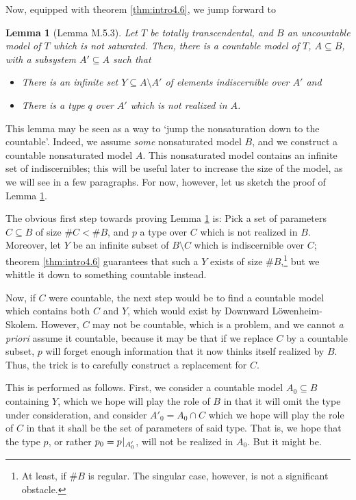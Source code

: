 \documentclass{article}
\newtheorem{lemma}[theorem]{Lemma}
\theoremstyle{nonumberplain}
\newcommand{\card}[1]{\#{#1}}
\newcommand{\rst}[2]{#1\mspace{1.3mu plus 0.5mu minus 0.5mu}|_{#2}}
\begin{document}
Now, equipped with theorem \ref{thm:intro4.6}, we jump forward to
\begin{lemma}[Lemma M.5.3]\label{lem:intro5.3}
Let $T$ be totally transcendental, and $B$ an uncountable model of $T$ which is not saturated. Then, there is a countable model of $T$, $A \subseteq B$, with a subsystem $A' \subseteq A$ such that
\begin{itemize}
\item There is an infinite set $Y \subseteq A \setminus A'$ of elements indiscernible over $A'$ and
\item There is a type $q$ over $A'$ which is not realized in $A$.
\end{itemize}
\end{lemma}

This lemma may be seen as a way to `jump the nonsaturation down to the countable'. Indeed, we assume \emph{some} nonsaturated model $B$, and we construct a countable nonsaturated model $A$. This nonsaturated model contains an infinite set of indiscernibles; this will be useful later to increase the size of the model, as we will see in a few paragraphs. For now, however, let us sketch the proof of Lemma \ref{lem:intro5.3}.

The obvious first step towards proving Lemma \ref{lem:intro5.3} is: Pick a set of parameters $C \subseteq B$ of size $\card C < \card B$, and $p$ a type over $C$ which is not realized in $B$. Moreover, let $Y$ be an infinite subset of $B \setminus C$ which is indiscernible over $C$; theorem \ref{thm:intro4.6} guarantees that such a $Y$ exists of size $\card B$,\footnote{At least, if $\card B$ is regular. The singular case, however, is not a significant obstacle.} but we whittle it down to something countable instead.

Now, if $C$ were countable, the next step would be to find a countable model which contains both $C$ and $Y$, which would exist by Downward Löwenheim-Skolem. However, $C$ may not be countable, which is a problem, and we cannot \textit{a priori} assume it countable, because it may be that if we replace $C$ by a countable subset, $p$ will forget enough information that it now thinks itself realized by $B$. Thus, the trick is to carefully construct a replacement for $C$.

This is performed as follows. First, we consider a countable model $A_0 \subseteq B$ containing $Y$, which we hope will play the role of $B$ in that it will omit the type under consideration, and consider $A'_0 = A_0 \cap C$ which we hope will play the role of $C$ in that it shall be the set of parameters of said type. That is, we hope that the type $p$, or rather $p_0 = \rst p{A'_0}$, will not be realized in $A_0$. But it might be.
\end{document}
